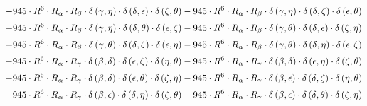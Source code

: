 \begin{subequations}
\begin{gather}
 \\[0.2em] \notag 		 - 945 \cdot R^{6} \cdot R_{\alpha{}} \cdot R_{\beta{}} \cdot \delta{}\left(\gamma{}, \eta{}\right) \cdot \delta{}\left(\delta{}, \epsilon{}\right) \cdot \delta{}\left(\zeta{}, \theta{}\right)- 945 \cdot R^{6} \cdot R_{\alpha{}} \cdot R_{\beta{}} \cdot \delta{}\left(\gamma{}, \eta{}\right) \cdot \delta{}\left(\delta{}, \zeta{}\right) \cdot \delta{}\left(\epsilon{}, \theta{}\right) 
 \\[0.2em] \notag 		 - 945 \cdot R^{6} \cdot R_{\alpha{}} \cdot R_{\beta{}} \cdot \delta{}\left(\gamma{}, \eta{}\right) \cdot \delta{}\left(\delta{}, \theta{}\right) \cdot \delta{}\left(\epsilon{}, \zeta{}\right)- 945 \cdot R^{6} \cdot R_{\alpha{}} \cdot R_{\beta{}} \cdot \delta{}\left(\gamma{}, \theta{}\right) \cdot \delta{}\left(\delta{}, \epsilon{}\right) \cdot \delta{}\left(\zeta{}, \eta{}\right) 
 \\[0.2em] \notag 		 - 945 \cdot R^{6} \cdot R_{\alpha{}} \cdot R_{\beta{}} \cdot \delta{}\left(\gamma{}, \theta{}\right) \cdot \delta{}\left(\delta{}, \zeta{}\right) \cdot \delta{}\left(\epsilon{}, \eta{}\right)- 945 \cdot R^{6} \cdot R_{\alpha{}} \cdot R_{\beta{}} \cdot \delta{}\left(\gamma{}, \theta{}\right) \cdot \delta{}\left(\delta{}, \eta{}\right) \cdot \delta{}\left(\epsilon{}, \zeta{}\right) 
 \\[0.2em] \notag 		 - 945 \cdot R^{6} \cdot R_{\alpha{}} \cdot R_{\gamma{}} \cdot \delta{}\left(\beta{}, \delta{}\right) \cdot \delta{}\left(\epsilon{}, \zeta{}\right) \cdot \delta{}\left(\eta{}, \theta{}\right)- 945 \cdot R^{6} \cdot R_{\alpha{}} \cdot R_{\gamma{}} \cdot \delta{}\left(\beta{}, \delta{}\right) \cdot \delta{}\left(\epsilon{}, \eta{}\right) \cdot \delta{}\left(\zeta{}, \theta{}\right) 
 \\[0.2em] \notag 		 - 945 \cdot R^{6} \cdot R_{\alpha{}} \cdot R_{\gamma{}} \cdot \delta{}\left(\beta{}, \delta{}\right) \cdot \delta{}\left(\epsilon{}, \theta{}\right) \cdot \delta{}\left(\zeta{}, \eta{}\right)- 945 \cdot R^{6} \cdot R_{\alpha{}} \cdot R_{\gamma{}} \cdot \delta{}\left(\beta{}, \epsilon{}\right) \cdot \delta{}\left(\delta{}, \zeta{}\right) \cdot \delta{}\left(\eta{}, \theta{}\right) 
 \\[0.2em] \notag 		 - 945 \cdot R^{6} \cdot R_{\alpha{}} \cdot R_{\gamma{}} \cdot \delta{}\left(\beta{}, \epsilon{}\right) \cdot \delta{}\left(\delta{}, \eta{}\right) \cdot \delta{}\left(\zeta{}, \theta{}\right)- 945 \cdot R^{6} \cdot R_{\alpha{}} \cdot R_{\gamma{}} \cdot \delta{}\left(\beta{}, \epsilon{}\right) \cdot \delta{}\left(\delta{}, \theta{}\right) \cdot \delta{}\left(\zeta{}, \eta{}\right) 

\end{gather}
\end{subequations}

